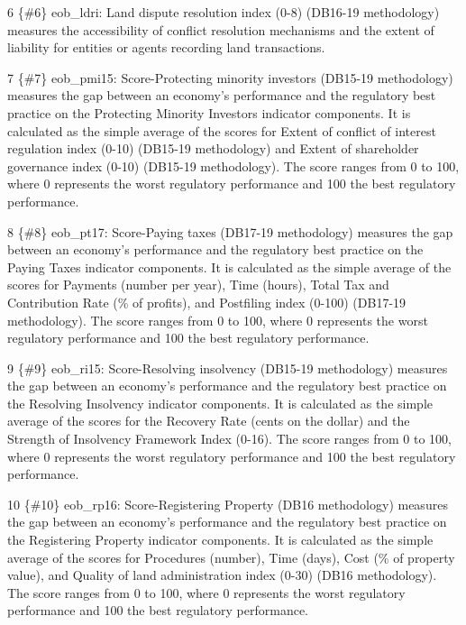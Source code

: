 \documentclass[
]{article}
\begin{document}
6 \{\#6\} eob\_ldri: Land dispute resolution index (0-8) (DB16-19
methodology) measures the accessibility of conflict resolution
mechanisms and the extent of liability for entities or agents recording
land transactions.

7 \{\#7\} eob\_pmi15: Score-Protecting minority investors (DB15-19
methodology) measures the gap between an economy's performance and the
regulatory best practice on the Protecting Minority Investors indicator
components. It is calculated as the simple average of the scores for
Extent of conflict of interest regulation index (0-10) (DB15-19
methodology) and Extent of shareholder governance index (0-10) (DB15-19
methodology). The score ranges from 0 to 100, where 0 represents the
worst regulatory performance and 100 the best regulatory performance.

8 \{\#8\} eob\_pt17: Score-Paying taxes (DB17-19 methodology) measures
the gap between an economy's performance and the regulatory best
practice on the Paying Taxes indicator components. It is calculated as
the simple average of the scores for Payments (number per year), Time
(hours), Total Tax and Contribution Rate (\% of profits), and Postfiling
index (0-100) (DB17-19 methodology). The score ranges from 0 to 100,
where 0 represents the worst regulatory performance and 100 the best
regulatory performance.

9 \{\#9\} eob\_ri15: Score-Resolving insolvency (DB15-19 methodology)
measures the gap between an economy's performance and the regulatory
best practice on the Resolving Insolvency indicator components. It is
calculated as the simple average of the scores for the Recovery Rate
(cents on the dollar) and the Strength of Insolvency Framework Index
(0-16). The score ranges from 0 to 100, where 0 represents the worst
regulatory performance and 100 the best regulatory performance.

10 \{\#10\} eob\_rp16: Score-Registering Property (DB16 methodology)
measures the gap between an economy's performance and the regulatory
best practice on the Registering Property indicator components. It is
calculated as the simple average of the scores for Procedures (number),
Time (days), Cost (\% of property value), and Quality of land
administration index (0-30) (DB16 methodology). The score ranges from 0
to 100, where 0 represents the worst regulatory performance and 100 the
best regulatory performance.
\end{document}
